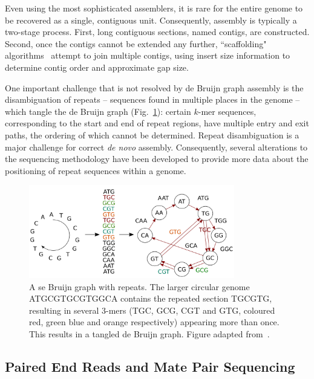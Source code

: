 Even using the most sophisticated assemblers, it is rare for the entire genome to be recovered as a single, contiguous unit. Consequently, assembly is typically a two-stage process. First, long contiguous sections, named contigs, are constructed. Second, once the contigs cannot be extended any further, ``scaffolding" algorithms~\cite{hunt2014} attempt to join multiple contigs, using insert size information to determine contig order and approximate gap size.

One important challenge that is not resolved by de Bruijn graph assembly is the disambiguation of repeats -- sequences found in multiple places in the genome -- which tangle the de Bruijn graph (Fig.~\ref{fig:tangle}): certain $k$-mer sequences, corresponding to the start and end of repeat regions, have multiple entry and exit paths, the ordering of which cannot be determined. Repeat disambiguation is a major challenge for correct \textit{de novo} assembly. Consequently, several alterations to the sequencing methodology have been developed to provide more data about the positioning of repeat sequences within a genome. 

\begin{figure}
\centerline{\includegraphics[width=0.8\textwidth]{illumina/de_bruijn_tangle.pdf}}
\caption{A se Bruijn graph with repeats. The larger circular genome ATGCGTGCGTGGCA contains the repeated section TGCGTG, resulting in several 3-mers (TGC, GCG, CGT and GTG, coloured red, green blue and orange respectively) appearing more than once. This results in a tangled de Bruijn graph. Figure adapted from~\cite{Compeau2011}.}
\label{fig:tangle}
\end{figure}

\subsection{Paired End Reads and Mate Pair Sequencing}
